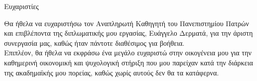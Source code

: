 \begin{center}
{\LARGE Ευχαριστίες}\\[1cm]
\end{center}
Θα ήθελα να ευχαριστήσω τον Αναπληρωτή Καθηγητή του Πανεπιστημίου Πατρών και επιβλέποντα της διπλωματικής μου εργασίας, Ευάγγελο Δερματά, για την άριστη συνεργασία μας, καθώς ήταν πάντοτε διαθέσιμος για βοήθεια.
\\[0.5 \baselineskip]
Επιπλέον, θα ήθελα να εκφράσω ένα μεγάλο ευχαριστώ στην οικογένεια μου για την καθημερινή οικονομική και ψυχολογική στήριξη που μου παρείχαν κατά την διάρκεια της ακαδημαϊκής μου πορείας, καθώς χωρίς αυτούς δεν θα τα κατάφερνα.
